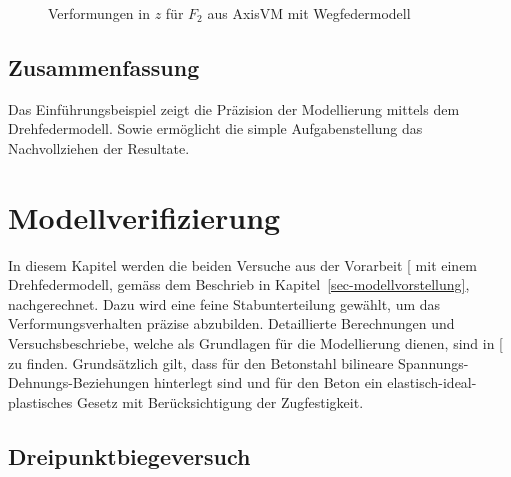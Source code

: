 \documentclass[
  11pt,
  letterpaper,
]{scrreprt}
\begin{document}
\begin{figure}[H]


\caption{\label{fig-f2-wegfeder}Verformungen in \(z\) für \(F_2\) aus
AxisVM mit Wegfedermodell}

\end{figure}%

\section{Zusammenfassung}\label{zusammenfassung}

Das Einführungsbeispiel zeigt die Präzision der Modellierung mittels dem
Drehfedermodell. Sowie ermöglicht die simple Aufgabenstellung das
Nachvollziehen der Resultate.


\chapter{Modellverifizierung}\label{modellverifizierung}

In diesem Kapitel werden die beiden Versuche aus der Vorarbeit
{[}\citeproc{ref-gitz_ansatze_2024}{1}{]} mit einem Drehfedermodell,
gemäss dem Beschrieb in Kapitel~\ref{sec-modellvorstellung},
nachgerechnet. Dazu wird eine feine Stabunterteilung gewählt, um das
Verformungsverhalten präzise abzubilden. Detaillierte Berechnungen und
Versuchsbeschriebe, welche als Grundlagen für die Modellierung dienen,
sind in {[}\citeproc{ref-gitz_ansatze_2024}{1}{]} zu finden.
Grundsätzlich gilt, dass für den Betonstahl bilineare
Spannungs-Dehnungs-Beziehungen hinterlegt sind und für den Beton ein
elastisch-ideal-plastisches Gesetz mit Berücksichtigung der
Zugfestigkeit.

\section{Dreipunktbiegeversuch}\label{dreipunktbiegeversuch}
\end{document}
